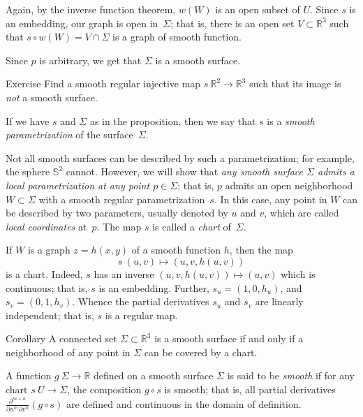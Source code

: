 Again, by the inverse function theorem, $w(W)$ is an open subset of $U$.
Since $s$ is an embedding, our graph is open in~$\Sigma$;
that is, there is an open set $V\subset \mathbb{R}^3$ such that $s\circ w(W)=V\cap \Sigma$ is a graph of smooth function.

Since $p$ is arbitrary, we get that $\Sigma$ is a smooth surface.
\qeds

\begin{thm}{Exercise}\label{ex:9-surf}
Find a smooth regular injective map $s\:\mathbb{R}^2\to\mathbb{R}^3$ such that its image is \textit{not} a smooth surface.
\end{thm}

If we have $s$ and $\Sigma$ as in the proposition, then we say that $s$ is a \emph{smooth parametrization} of the surface~$\Sigma$. 

Not all smooth surfaces can be described by such a parametrization;
for example, the sphere $\mathbb{S}^2$ cannot.
However, we will show that \textit{any smooth surface $\Sigma$ admits a local parametrization at any point $p\in\Sigma$}; that is,  $p$ admits an open neighborhood $W\subset \Sigma$ with a smooth regular parametrization~$s$.
In this case, any point in $W$ can be described by two parameters, usually denoted by $u$ and $v$, 
which are called \emph{local coordinates} at~$p$.
The map $s$ is called a \emph{chart} of~$\Sigma$.

If $W$ is a graph $z=h(x,y)$ of a smooth function $h$, then the map 
\[s\:(u,v)\mapsto (u,v,h(u,v))\] is a chart.
Indeed, $s$ has an inverse $(u,v,h(u,v))\mapsto (u,v)$ which is continuous;
that is, $s$ is an embedding.
Further,
$s_u=(1,0,h_u)$, and $s_v=(0,1,h_v)$. 
Whence the partial derivatives $s_u$ and $s_v$ are linearly independent;
that is, $s$ is a regular map.

\begin{thm}{Corollary}\label{cor:reg-parmeterization}
A connected set $\Sigma\subset \mathbb{R}^3$ is a smooth surface if and only if a neighborhood of any point in $\Sigma$ can be covered by a chart.
\end{thm}

A function $g\: \Sigma \to \mathbb{R}$ defined on a smooth surface $\Sigma$ is said to be \emph{smooth} if for any chart $s \: U\to \Sigma$,
the composition $g\circ s$ is smooth; that is, all partial derivatives $\frac{\partial^{m+n}}{\partial u^m\partial v^n}(g\circ s)$ are defined and continuous in the domain of definition.

